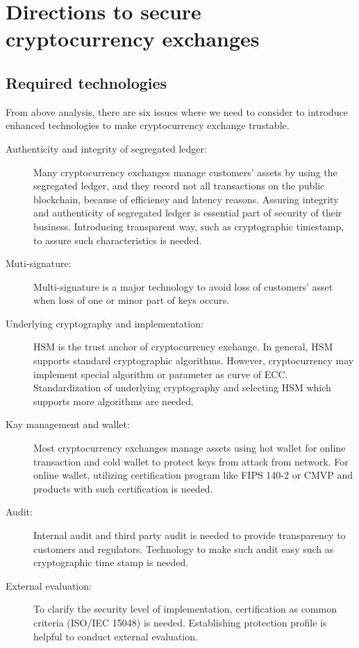 \section{Directions to secure cryptocurrency exchanges}
\subsection{Required technologies}
From above analysis, there are six issues where we need to consider to introduce enhanced technologies to make cryptocurrency exchange trustable.
\begin{description}
 \item[Authenticity and integrity of segregated ledger:]
       Many cryptocurrency exchanges manage customers' assets by using the segregated ledger, and
       they record not all transactions on the public blockchain, because of efficiency and latency
       reasons. Assuring integrity and authenticity of segregated ledger is essential part of
       security of their business. Introducing transparent way,
       such as cryptographic timestamp, to assure such characteristics is needed.

 \item[Muti-signature:]
       Multi-signature is a major technology to avoid loss of customers' asset when loss of one or
       minor part of keys occurs.

 \item[Underlying cryptography and implementation:]
       HSM is the trust anchor of cryptocurrency exchange. In general, HSM supports standard cryptographic
       algorithms. However, cryptocurrency may implement special algorithm or parameter as curve of ECC.
       Standardization of underlying cryptography and selecting HSM which supports
       more algorithms are needed.

 \item[Kay management and wallet:]
       Most cryptocurrency exchanges manage assets using hot wallet for online transaction and cold wallet
       to protect keys from attack from network. For online wallet, utilizing certification program like
       FIPS 140-2 or CMVP and products with such certification is needed.

 \item[Audit:] Internal audit and third party audit is needed to provide transparency to customers
       and regulators. Technology to make such audit easy such as cryptographic time stamp is needed.

 \item[External evaluation:]
       To clarify the security level of implementation, certification as common criteria (ISO/IEC 15048)
       is needed. Establishing protection profile is helpful to conduct external evaluation.
\end{description}

